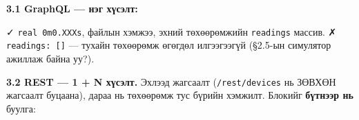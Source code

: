 \begin{Shaded}
\begin{Highlighting}[]
\VariableTok{)}
\end{Highlighting}
\end{Shaded}

\textbf{3.1 GraphQL --- нэг хүсэлт:}

\begin{Shaded}
\begin{Highlighting}[]
 \KeywordTok{\textbackslash{}}
   \KeywordTok{\textbackslash{}}
   
 
\end{Highlighting}
\end{Shaded}

✓ \texttt{real\ 0m0.XXXs}, файлын хэмжээ, эхний төхөөрөмжийн \texttt{readings} массив. ✗ \texttt{readings:\allowbreak{}\ {[}{]}} --- тухайн төхөөрөмж өгөгдөл илгээгээгүй (§2.5-ын симулятор ажиллаж байна уу?).

\textbf{3.2 REST --- 1 + N хүсэлт.} Эхлээд жагсаалт (\texttt{/rest/devices} нь ЗӨВХӨН жагсаалт буцаана), дараа нь төхөөрөмж тус бүрийн хэмжилт. Блокийг \textbf{бүтнээр нь} буулга:

